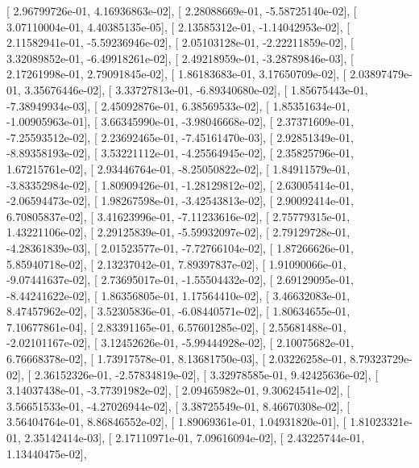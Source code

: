 \documentclass{article}
\begin{document}
       [  2.96799726e-01,   4.16936863e-02],
       [  2.28088669e-01,  -5.58725140e-02],
       [  3.07110004e-01,   4.40385135e-05],
       [  2.13585312e-01,  -1.14042953e-02],
       [  2.11582941e-01,  -5.59236946e-02],
       [  2.05103128e-01,  -2.22211859e-02],
       [  3.32089852e-01,  -6.49918261e-02],
       [  2.49218959e-01,  -3.28789846e-03],
       [  2.17261998e-01,   2.79091845e-02],
       [  1.86183683e-01,   3.17650709e-02],
       [  2.03897479e-01,   3.35676446e-02],
       [  3.33727813e-01,  -6.89340680e-02],
       [  1.85675443e-01,  -7.38949934e-03],
       [  2.45092876e-01,   6.38569533e-02],
       [  1.85351634e-01,  -1.00905963e-01],
       [  3.66345990e-01,  -3.98046668e-02],
       [  2.37371609e-01,  -7.25593512e-02],
       [  2.23692465e-01,  -7.45161470e-03],
       [  2.92851349e-01,  -8.89358193e-02],
       [  3.53221112e-01,  -4.25564945e-02],
       [  2.35825796e-01,   1.67215761e-02],
       [  2.93446764e-01,  -8.25050822e-02],
       [  1.84911579e-01,  -3.83352984e-02],
       [  1.80909426e-01,  -1.28129812e-02],
       [  2.63005414e-01,  -2.06594473e-02],
       [  1.98267598e-01,  -3.42543813e-02],
       [  2.90092414e-01,   6.70805837e-02],
       [  3.41623996e-01,  -7.11233616e-02],
       [  2.75779315e-01,   1.43221106e-02],
       [  2.29125839e-01,  -5.59932097e-02],
       [  2.79129728e-01,  -4.28361839e-03],
       [  2.01523577e-01,  -7.72766104e-02],
       [  1.87266626e-01,   5.85940718e-02],
       [  2.13237042e-01,   7.89397837e-02],
       [  1.91090066e-01,  -9.07441637e-02],
       [  2.73695017e-01,  -1.55504432e-02],
       [  2.69129095e-01,  -8.44241622e-02],
       [  1.86356805e-01,   1.17564410e-02],
       [  3.46632083e-01,   8.47457962e-02],
       [  3.52305836e-01,  -6.08440571e-02],
       [  1.80634655e-01,   7.10677861e-04],
       [  2.83391165e-01,   6.57601285e-02],
       [  2.55681488e-01,  -2.02101167e-02],
       [  3.12452626e-01,  -5.99444928e-02],
       [  2.10075682e-01,   6.76668378e-02],
       [  1.73917578e-01,   8.13681750e-03],
       [  2.03226258e-01,   8.79323729e-02],
       [  2.36152326e-01,  -2.57834819e-02],
       [  3.32978585e-01,   9.42425636e-02],
       [  3.14037438e-01,  -3.77391982e-02],
       [  2.09465982e-01,   9.30624541e-02],
       [  3.56651533e-01,  -4.27026944e-02],
       [  3.38725549e-01,   8.46670308e-02],
       [  3.56404764e-01,   8.86846552e-02],
       [  1.89069361e-01,   1.04931820e-01],
       [  1.81023321e-01,   2.35142414e-03],
       [  2.17110971e-01,   7.09616094e-02],
       [  2.43225744e-01,   1.13440475e-02],
\end{document}

